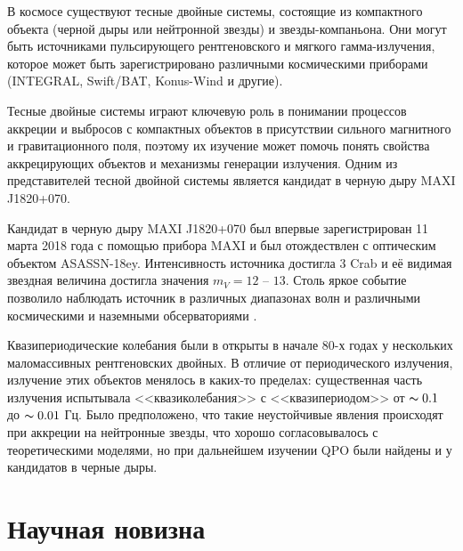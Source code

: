 	В космосе существуют тесные двойные системы, состоящие из компактного объекта (черной дыры или нейтронной звезды) и звезды-компаньона. Они могут быть источниками пульсирующего рентгеновского и мягкого гамма-излучения, которое может быть зарегистрировано различными космическими приборами (INTEGRAL, Swift/BAT, Konus-Wind и другие).
	
	Тесные двойные системы играют ключевую роль в понимании процессов аккреции и выбросов с компактных объектов в присутствии сильного магнитного и гравитационного поля, поэтому их изучение может помочь понять свойства аккрецирующих объектов и механизмы генерации излучения. Одним из представителей тесной двойной системы является кандидат в черную дыру MAXI J1820+070.
			
	Кандидат в черную дыру MAXI J1820+070 был впервые зарегистрирован 11 марта 2018 года с помощью прибора MAXI и был отождествлен с оптическим объектом ASASSN-18ey. Интенсивность источника достигла 3 Crab и её видимая звездная величина достигла значения $m_{V} = 12$ -- $13$. Столь яркое событие позволило наблюдать источник в различных диапазонах волн и различными космическими и наземными обсерваториями \cite{veledinaa.2018}.
	
	Квазипериодические колебания были в открыты в начале 80-х годах у нескольких маломассивных рентгеновских двойных. В отличие от периодического излучения, излучение этих объектов менялось в каких-то пределах: существенная часть излучения испытывала <<квазиколебания>> с <<квазипериодом>> от $\thicksim 0.1$ до $\thicksim 0.01$ Гц. Было предположено, что такие неустойчивые явления происходят при аккреции на нейтронные звезды, что хорошо согласовывалось с теоретическими моделями, но при дальнейшем изучении QPO были найдены и у кандидатов в черные дыры.
	
\section*{Научная новизна}
	